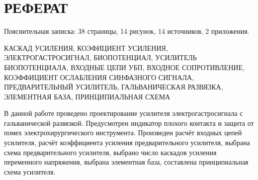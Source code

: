 \begin{sloppypar} %
\newpage %
\section*{РЕФЕРАТ} %
Пояснительная записка: 38 страницы, 14 рисунок, 14 источников, 2 приложения.


КАСКАД УСИЛЕНИЯ, КОЭФИЦИЕНТ УСИЛЕНИЯ, ЭЛЕКТРОГАСТРОСИГНАЛ, БИОПОТЕНЦИАЛ, УСИЛИТЕЛЬ БИОПОТЕНЦИАЛА, ВХОДНЫЕ ЦЕПИ УБП, ВХОДНОЕ СОПРОТИВЛЕНИЕ, КОЭФФИЦИЕНТ ОСЛАБЛЕНИЯ СИНФАЗНОГО СИГНАЛА, ПРЕДВАРИТЕЛЬНЫЙ УСИЛИТЕЛЬ, ГАЛЬВАНИЧЕСКАЯ РАЗВЯЗКА, ЭЛЕМЕНТНАЯ БАЗА, ПРИНЦИПИАЛЬНАЯ СХЕМА


В данной работе проведено проектирование усилителя электрогастросигнала с гальванической развязкой. Предусмотрен индикатор плохого контакта и защита от помех электрохирургического инструмента. Произведен расчёт входных цепей усилителя, расчёт коэффициента усиления предварительного усилителя, выбрана схема предварительного усилителя, выбрано число каскадов усиления переменного напряжения, выбрана элементная база, составлена принципиальная схема усилителя. 



\end{sloppypar}
